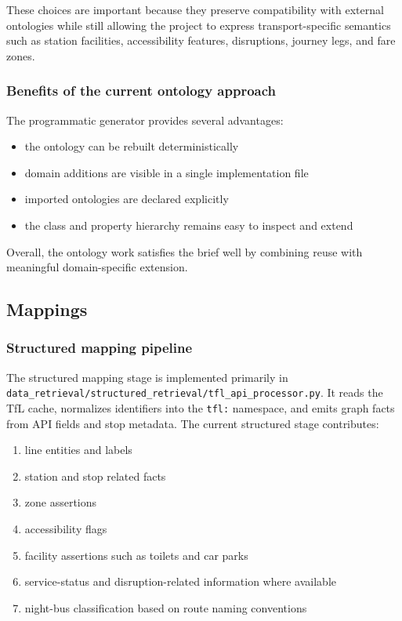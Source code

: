 \documentclass[
  11pt,
  a4paper,
]{article}
\providecommand{\tightlist}{%
  \setlength{\itemsep}{0pt}\setlength{\parskip}{0pt}}
\begin{document}
These choices are important because they preserve compatibility with
external ontologies while still allowing the project to express
transport-specific semantics such as station facilities, accessibility
features, disruptions, journey legs, and fare zones.

\subsubsection{Benefits of the current ontology
approach}\label{benefits-of-the-current-ontology-approach}

The programmatic generator provides several advantages:

\begin{itemize}
\tightlist
\item
  the ontology can be rebuilt deterministically
\item
  domain additions are visible in a single implementation file
\item
  imported ontologies are declared explicitly
\item
  the class and property hierarchy remains easy to inspect and extend
\end{itemize}

Overall, the ontology work satisfies the brief well by combining reuse
with meaningful domain-specific extension.

\subsection{Mappings}\label{mappings}

\subsubsection{Structured mapping
pipeline}\label{structured-mapping-pipeline}

The structured mapping stage is implemented primarily in
\texttt{data\_retrieval/structured\_retrieval/tfl\_api\_processor.py}.
It reads the TfL cache, normalizes identifiers into the \texttt{tfl:}
namespace, and emits graph facts from API fields and stop metadata. The
current structured stage contributes:

\begin{enumerate}
\def\labelenumi{\arabic{enumi}.}
\tightlist
\item
  line entities and labels
\item
  station and stop related facts
\item
  zone assertions
\item
  accessibility flags
\item
  facility assertions such as toilets and car parks
\item
  service-status and disruption-related information where available
\item
  night-bus classification based on route naming conventions
\end{enumerate}
\end{document}
